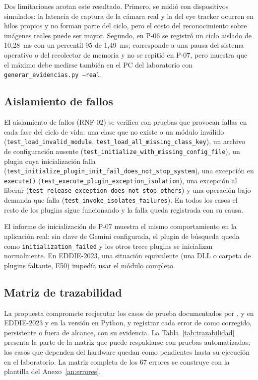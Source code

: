 Dos limitaciones acotan este resultado. Primero, se midió con dispositivos simulados: la latencia de captura de la cámara real y la del eye tracker ocurren en hilos propios y no forman parte del ciclo, pero el costo del reconocimiento sobre imágenes reales puede ser mayor. Segundo, en P-06 se registró un ciclo aislado de 10,28~ms con un percentil 95 de 1,49~ms; corresponde a una pausa del sistema operativo o del recolector de memoria y no se repitió en P-07, pero muestra que el máximo debe medirse también en el PC del laboratorio con \texttt{generar\_evidencias.py --real}.

\subsection{Aislamiento de fallos}

El aislamiento de fallos (RNF-02) se verifica con pruebas que provocan fallas en cada fase del ciclo de vida: una clase que no existe o un módulo inválido (\texttt{test\_load\_invalid\_module}, \texttt{test\_load\_all\_missing\_class\_key}), un archivo de configuración ausente (\texttt{test\_initialize\_with\_missing\_config\_file}), un plugin cuya inicialización falla (\texttt{test\_initialize\_plugin\_init\_fail\_does\_not\_stop\_system}), una excepción en \texttt{execute()} (\texttt{test\_execute\_plugin\_exception\_isolation}), una excepción al liberar (\texttt{test\_release\_exception\_does\_not\_stop\_others}) y una operación bajo demanda que falla (\texttt{test\_invoke\_isolates\_failures}). En todos los casos el resto de los plugins sigue funcionando y la falla queda registrada con su causa.

El informe de inicialización de P-07 muestra el mismo comportamiento en la aplicación real: sin clave de Gemini configurada, el plugin de búsqueda queda como \texttt{initialization\_failed} y los otros trece plugins se inicializan normalmente. En EDDIE-2023, una situación equivalente (una DLL o carpeta de plugins faltante, E50) impedía usar el módulo completo.

\subsection{Matriz de trazabilidad}
\label{sec:trazabilidad}

La propuesta compromete reejecutar los casos de prueba documentados por \citet{pezoa2020implementacion}, \citet{contreras2019desarrollo} y \citet{estay2020modulo} en EDDIE-2023 y en la versión en Python, y registrar cada error de \citet{ibaceta2023evaluacion} como corregido, persistente o fuera de alcance, con su evidencia. La Tabla~\ref{tab:trazabilidad} presenta la parte de la matriz que puede respaldarse con pruebas automatizadas; los casos que dependen del hardware quedan como pendientes hasta su ejecución en el laboratorio. La matriz completa de los 67 errores se construye con la plantilla del Anexo~\ref{an:errores}.

